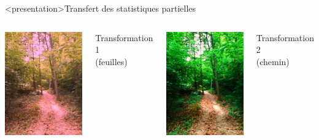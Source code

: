\begin{frame}<presentation>{Transfert des statistiques partielles}
  \begin{columns}
    \column{6cm}
    \centering
    \includegraphics[width=4cm]{dst1}

    Transformation 1 \\ (feuilles)

    \column{6cm}
    \centering
    \includegraphics[width=4cm]{dst2}

    Transformation 2 \\ (chemin)
  \end{columns}
\end{frame}

